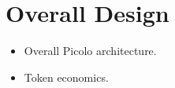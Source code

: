 \section{Overall Design}

    \begin{itemize}
        \item Overall Picolo architecture.
        \item Token economics.
    \end{itemize}


